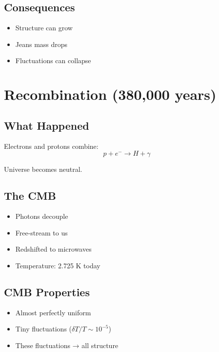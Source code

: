 \documentclass[
  11pt,
  letterpaper,
  twoside,
  openright]{book}
\providecommand{\tightlist}{%
  \setlength{\itemsep}{0pt}\setlength{\parskip}{0pt}}
\begin{document}
\subsection{Consequences}\label{consequences}

\begin{itemize}
\tightlist
\item
  Structure can grow
\item
  Jeans mass drops
\item
  Fluctuations can collapse
\end{itemize}

\section{Recombination (380,000
years)}\label{recombination-380000-years}

\subsection{What Happened}\label{what-happened-1}

Electrons and protons combine: \[
p + e^- \rightarrow H + \gamma
\]

Universe becomes neutral.

\subsection{The CMB}\label{the-cmb}

\begin{itemize}
\tightlist
\item
  Photons decouple
\item
  Free-stream to us
\item
  Redshifted to microwaves
\item
  Temperature: 2.725 K today
\end{itemize}

\subsection{CMB Properties}\label{cmb-properties}

\begin{itemize}
\tightlist
\item
  Almost perfectly uniform
\item
  Tiny fluctuations (\(\delta T/T \sim 10^{-5}\))
\item
  These fluctuations → all structure
\end{itemize}
\end{document}
